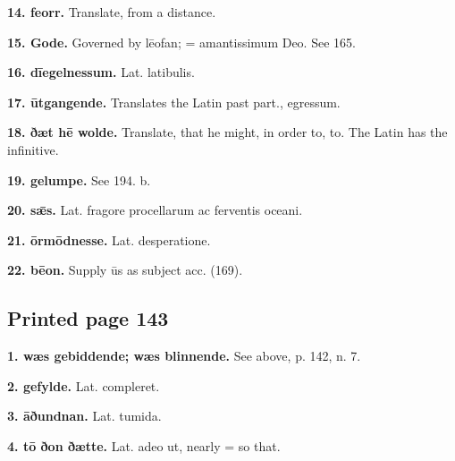 \textbf{14. feorr.} Translate, from a distance.

\textbf{15. Gode.} Governed by lēofan; = amantissimum Deo. See 165.

\textbf{16. dīegelnessum.} Lat. latibulis.

\textbf{17. ūtgangende.} Translates the Latin past part., egressum.

\textbf{18. ðæt hē wolde.} Translate, that he might, in order to, to. The Latin has the infinitive.

\textbf{19. gelumpe.} See 194. b.

\textbf{20. sǣs.} Lat. fragore procellarum ac ferventis oceani.

\textbf{21. ōrmōdnesse.} Lat. desperatione.

\textbf{22. bēon.} Supply ūs as subject acc. (169).

\subsection*{Printed page 143}

\textbf{1. wæs gebiddende; wæs blinnende.} See above, p. 142, n. 7.

\textbf{2. gefylde.} Lat. compleret.

\textbf{3. āðundnan.} Lat. tumida.

\textbf{4. tō ðon ðætte.} Lat. adeo ut, nearly = so that.

